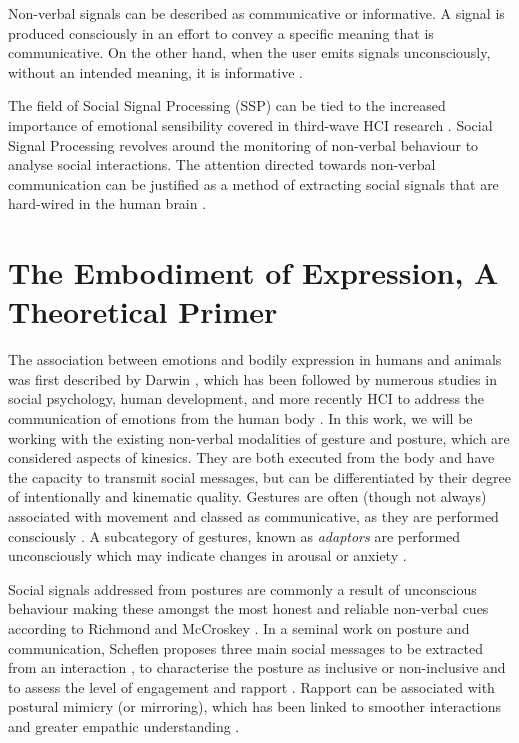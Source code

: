 Non-verbal signals can be described as communicative or informative. A signal is produced consciously in an effort to convey a specific meaning that is communicative. On the other hand, when the user emits signals unconsciously, without an intended meaning, it is informative \cite{vinciarelli_towards_2011}.

The field of Social Signal Processing (SSP) can be tied to the increased importance of emotional sensibility covered in third-wave HCI research \cite{cristescu_emotions_2008}. Social Signal Processing revolves around the monitoring of non-verbal behaviour to analyse social interactions. The attention directed towards non-verbal communication can be justified as a method of extracting social signals that are hard-wired in the human brain \cite{vinciarelli_social_2009-1}.

\section{The Embodiment of Expression, A Theoretical Primer}
\label{background:ebodiment_emotions}

The association between emotions and bodily expression in humans and animals was first described by Darwin \cite{darwin_expression_2013}, which has been followed by numerous studies in social psychology, human development, and more recently HCI \cite{alaoui_movement_2012, gillies_creating_2018, fdili_alaoui_strategies_2015} to address the communication of emotions from the human body \cite{gunes_lab_2008}. In this work, we will be working with the existing non-verbal modalities of gesture and posture, which are considered aspects of kinesics. They are both executed from the body and have the capacity to transmit social messages, but can be differentiated by their degree of intentionally and kinematic quality. Gestures are often (though not always) associated with movement and classed as communicative, as they are performed consciously \cite{vinciarelli_towards_2011}. A subcategory of gestures, known as \textit{adaptors} are performed unconsciously which may indicate changes in arousal or anxiety \cite{hans_kinesics_2015, neff_dont_2011}.

Social signals addressed from postures are commonly a result of unconscious behaviour making these amongst the most honest and reliable non-verbal cues according to Richmond and McCroskey \cite{richmond_nonverbal_2011}. In a seminal work on posture and communication, Scheflen proposes three main social messages to be extracted from an interaction \cite{scheflen_significance_1964}, to characterise the posture as inclusive or non-inclusive and to assess the level of engagement and rapport \cite{vinciarelli_social_2009}. Rapport can be associated with postural mimicry (or mirroring), which has been linked to smoother interactions and greater empathic understanding \cite{chartrand_chameleon_1999}.

